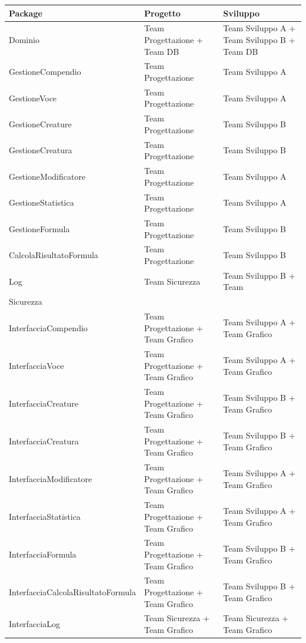 \documentclass[a4paper, 11pt]{article}
\let\newline\\
\begin{document}
\begin{adjustwidth}{-1.5cm}{-1.5cm}
    \begin{center}
    \begin{longtable}{|p{6cm}|p{4.5cm}|p{4.5cm}|}
        \hline
        \textbf{Package} & \textbf{Progetto} & \textbf{Sviluppo} \\\hline
        Dominio & Team Progettazione + Team DB & Team Sviluppo A + Team Sviluppo B + Team DB\\\hline
        GestioneCompendio & Team Progettazione & Team Sviluppo A\\\hline
        GestioneVoce & Team Progettazione & Team Sviluppo A\\\hline
        GestioneCreature & Team Progettazione & Team Sviluppo B\\\hline
        GestioneCreatura& Team Progettazione & Team Sviluppo B\\\hline
        GestioneModificatore & Team Progettazione & Team Sviluppo A \\\hline
        GestioneStatistica & Team Progettazione & Team Sviluppo A\\\hline
        GestioneFormula & Team Progettazione & Team Sviluppo B\\\hline
        CalcolaRisultatoFormula & Team Progettazione & Team Sviluppo B\\\hline
        Log & Team Sicurezza & Team Sviluppo B + Team \newline Sicurezza\\\hline
        InterfacciaCompendio & Team Progettazione + Team Grafico & Team Sviluppo A + Team Grafico\\\hline
        InterfacciaVoce & Team Progettazione + Team Grafico &Team Sviluppo A + Team Grafico\\\hline
        InterfacciaCreature & Team Progettazione + Team Grafico &Team Sviluppo B + Team Grafico\\\hline
        InterfacciaCreatura & Team Progettazione + Team Grafico &Team Sviluppo B + Team Grafico\\\hline
        InterfacciaModificatore & Team Progettazione + Team Grafico & Team Sviluppo A + Team Grafico \\\hline
        InterfacciaStatistica & Team Progettazione + Team Grafico &Team Sviluppo A + Team Grafico\\\hline
        InterfacciaFormula & Team Progettazione + Team Grafico & Team Sviluppo B + Team Grafico \\\hline
        InterfacciaCalcolaRisultatoFormula & Team Progettazione + Team Grafico &Team Sviluppo B + Team Grafico\\\hline
        InterfacciaLog & Team Sicurezza + Team Grafico & Team Sicurezza + Team Grafico\\
        \hline
    \end{longtable}
\end{center}
\end{adjustwidth}
\end{document}
